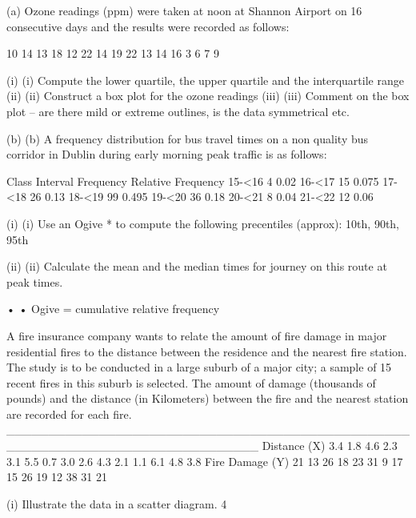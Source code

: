 

(a) Ozone readings (ppm) were taken at noon at Shannon Airport on 16 consecutive days and the results were recorded as follows:
 
10	14	13	18	12	22	14	19
22	13	14	16	  3	  6	  7	  9
 
(i)	(i)                  Compute the lower quartile, the upper quartile and the interquartile range
(ii)	(ii)                Construct a box plot for the ozone readings
(iii)	(iii)               Comment on the box plot – are there mild or extreme outlines, is the data symmetrical etc.
 
(b)	(b)               A frequency distribution for bus travel times on a non quality bus corridor in Dublin during early morning peak traffic is as follows:
 
Class Interval		Frequency		Relative Frequency
15-<16			  4			0.02
16-<17			15			0.075
17-<18			26			0.13
18-<19			99			0.495
19-<20			36			0.18
20-<21			  8			0.04
21-<22			12			0.06
 
(i)	(i)                  Use an Ogive * to compute the following precentiles (approx):
10th, 90th, 95th
 
(ii)	(ii)                Calculate the mean and the median times for journey on this route at peak times.
 
•	•        Ogive = cumulative relative frequency
 
 
 

A fire insurance company wants to relate the amount of fire damage in major residential fires to the distance between the residence and the nearest fire station. The study is to be conducted in a large suburb of a major city; a sample of 15 recent fires in this suburb is selected. The amount of damage (thousands of pounds) and the distance (in Kilometers) between the fire and the nearest station are recorded for each fire. 
______________________________________________________________________________
Distance (X) 	 3.4   1.8    4.6    2.3    3.1    5.5    0.7    3.0    2.6    4.3    2.1    1.1    6.1    4.8   3.8 
Fire Damage (Y)   21    13     26     18     23     31     9       17     15     26     19     12     38     31    21    
 
(i)   Illustrate the data in a scatter diagram. 					4 
 
